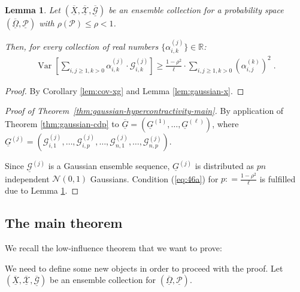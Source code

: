 \documentclass{daj}
\newcommand{\1}{\mathbbm{1}}
\theoremstyle{plain}
\newtheorem{lemma}[theorem]{Lemma}
\theoremstyle{definition}
\DeclareMathOperator*{\Var}{Var}
\begin{document}
\begin{lemma}
\label{lem:gaussian-g}
Let $(\overline{\underline{X}}, 
\overline{\underline{\mathcal{X}}},
\overline{\underline{\mathcal{G}}})$ be an ensemble collection
for a probability space 
$(\overline{\underline{\Omega}}, \underline{\mathcal{P}})$
with $\rho(\mathcal{P}) \le \rho < 1$.

Then,
for every collection of real numbers $\{\alpha_{i,k}^{(j)}\} \in \mathbb{R}$:
\begin{align*}
 \Var\left[ \sum_{i,j\ge1, k>0} \alpha_{i,k}^{(j)} \cdot \mathcal{G}_{i,k}^{(j)} 
  \right]
      \ge \frac{1-\rho^2}{\ell} \cdot \sum_{i,j \ge 1,k > 0} 
      \left( \alpha_{i,j}^{(k)} \right)^2 \; .
\end{align*}
\end{lemma}

\begin{proof}
By Corollary \ref{lem:cov-xg}  and Lemma \ref{lem:gaussian-x}.
\end{proof}

\begin{proof}[Proof of Theorem~\ref{thm:gaussian-hypercontractivity-main}]
By application of Theorem \ref{thm:gaussian-cdp} to
$\overline{\underline{G}} = 
(\underline{G}^{(1)}, \ldots, \allowbreak \underline{G}^{(\ell)})$,
where $\underline{G}^{(j)} = 
(\mathcal{G}_{i,1}^{(j)}, \allowbreak \ldots, \allowbreak \mathcal{G}_{i,p}^{(j)},
\ldots, \mathcal{G}_{n,1}^{(j)}, \ldots, \mathcal{G}_{n,p}^{(j)})$.

Since $\underline{\mathcal{G}}^{(j)}$ is a Gaussian ensemble sequence,
$\underline{G}^{(j)}$ is distributed as $pn$ independent
$\mathcal{N}(0, 1)$ Gaussians. Condition (\ref{eq:46a}) 
for $p: = \frac{1-\rho^2}{\ell}$ is fulfilled
due to Lemma \ref{lem:gaussian-g}.
\end{proof}


\subsection{The main theorem}

We recall the low-influence theorem that we want to prove:
\lowinfluence*

We need to define some new objects in order to proceed with the proof.
Let $(\overline{\underline{X}}, 
\overline{\underline{\mathcal{X}}},
\overline{\underline{\mathcal{G}}})$ be an ensemble collection for
$(\overline{\underline{\Omega}}, \underline{\mathcal{P}})$.
\end{document}
